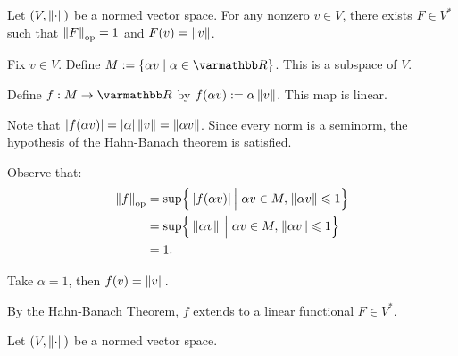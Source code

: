 \documentclass[10pt,oneside,openany]{memoir}
\begin{document}
\begin{corollary}
    Let $(V,\lnorm \cdot \rnorm)$ be a normed vector space. For any nonzero $v \in V$, there exists $F \in V^\ast$ such that $\lnorm F \rnorm_{\op} = 1$ and $F(v) = \lnorm v \rnorm$.
\end{corollary}
    \begin{sproof}
        Fix $v \in V$. Define $M := \{\alpha v \mid \alpha \in \bfR\}$. This is a subspace of $V$.\nl
        
        \noindent Define $f:M \rightarrow \bfR$ by $f(\alpha v) := \alpha \lnorm v \rnorm$. This map is linear. \nl
        
        \noindent Note that $|f(\alpha v)| = |\alpha| \lnorm v \rnorm = \lnorm \alpha v \rnorm$. Since every norm is a seminorm, the hypothesis of the Hahn-Banach theorem is satisfied.   \nl
         
        \noindent Observe that:
            \begin{equation*}
            \begin{split}
                \lnorm f \rnorm_{\op}
                & = \sup \Bigl\{\h2|f(\alpha v)| \h2\Big|\h3 \alpha v \in M, \h1 \lnorm \alpha v \rnorm \leq 1\Bigr\} \\
                & = \sup \Bigl\{\h2\lnorm \alpha v \rnorm \h2\Big|\h3 \alpha v \in M, \h1 \lnorm \alpha v \rnorm \leq 1\Bigr\} \\
                & = 1.
            \end{split}
            \end{equation*}

        \noindent Take $\alpha = 1$, then $f(v) = \lnorm v \rnorm$. \nl
        
        \noindent By the Hahn-Banach Theorem, $f$ extends to a linear functional $F \in V^\ast$. \qedhere
    \end{sproof}

\begin{corollary}
    Let $(V,\lnorm \cdot \rnorm)$ be a normed vector space. 
\end{corollary}
\end{document}
